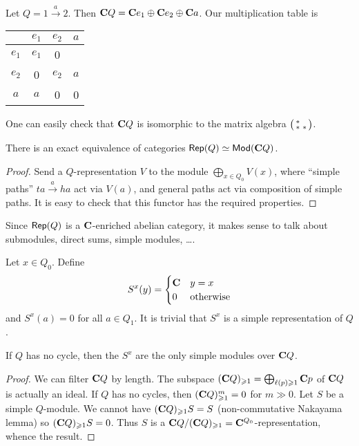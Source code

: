 \documentclass{article}
\begin{document}
\begin{example}
Let $Q=1\xrightarrow a 2$. Then $\mathbf{C} Q = \mathbf{C} e_1 \oplus \mathbf{C} e_2 \oplus \mathbf{C} a$. 
Our multiplication table is 
\begin{center}
\begin{tabular}{c|ccc}
        & $e_1$ & $e_2$ & $a$ \\ \hline
  $e_1$ & $e_1$ & 0 \\
  $e_2$ & 0     & $e_2$ & $a$ \\
  $a$   & $a$   & 0     & 0
\end{tabular}
\end{center}
One can easily check that $\mathbf{C} Q$ is isomorphic to the matrix algebra 
$\bigl(\begin{smallmatrix} \ast &  \\ \ast & \ast \end{smallmatrix} \bigr)$. 
\end{example}

\begin{proposition}
There is an exact equivalence of categories 
$\operatorname{\mathsf{Rep}}(Q) \simeq \operatorname{\mathsf{Mod}}(\mathbf{C} Q)$. 
\end{proposition}
\begin{proof}
Send a $Q$-representation $V$ to the module $\bigoplus_{x\in Q_0} V(x)$, where 
``simple paths'' $t a \xrightarrow a h a$ act via $V(a)$, and general paths act 
via composition of simple paths. It is easy to check that this functor has the 
required properties. 
\end{proof}



Since $\operatorname{\mathsf{Rep}}(Q)$ is a $\mathbf{C}$-enriched abelian category, it makes 
sense to talk about submodules, direct sums, simple modules, \ldots. 

\begin{example}
Let $x\in Q_0$. Define 
\[
  S^x(y) = \begin{cases} \mathbf{C} & y=x \\ 0 & \text{otherwise} \end{cases} 
\]
and $S^x(a) = 0$ for all $a\in Q_1$. It is trivial that $S^x$ is a simple 
representation of $Q$. 
\end{example}

\begin{proposition}
If $Q$ has no cycle, then the $S^x$ are the only simple modules over $\mathbf{C} Q$. 
\end{proposition}
\begin{proof}
We can filter $\mathbf{C} Q$ by length. The subspace 
$(\mathbf{C} Q)_{\geqslant 1} = \bigoplus_{\ell(p)\geqslant 1} \mathbf{C} p$ of 
$\mathbf{C} Q$ is actually an ideal. If $Q$ has no cycles, then 
$(\mathbf{C} Q)_{\geqslant 1}^m = 0$ for $m\gg 0$. Let $S$ be a simple $Q$-module.
We cannot have $(\mathbf{C} Q)_{\geqslant 1} S=S$ (non-commutative Nakayama 
lemma) so $(\mathbf{C} Q)_{\geqslant 1} S = 0$. Thus $S$ is a 
$\mathbf{C} Q/(\mathbf{C} Q)_{\geqslant 1}=\mathbf{C}^{Q_0}$-representation, whence the result.  
\end{proof}
\end{document}
